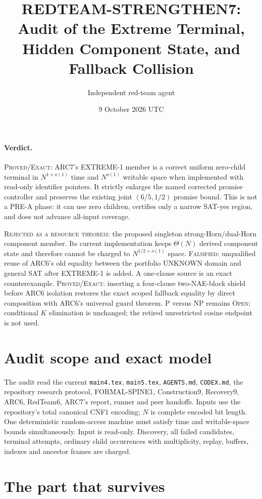 \documentclass[11pt]{article}
\title{REDTEAM-STRENGTHEN7: Audit of the Extreme Terminal,\\Hidden Component State, and Fallback Collision}
\author{Independent red-team agent}
\date{9 October 2026 UTC}
\begin{document}
\sloppy\maketitle

\paragraph{Verdict.}
\textsc{Proved/Exact}: ARC7's \textsc{EXTREME-1} member is a correct uniform
zero-child terminal in $N^{1+o(1)}$ time and $N^{o(1)}$ writable space when
implemented with read-only identifier pointers.  It strictly enlarges the
named corrected promise controller and preserves the existing joint
$(6/5,1/2)$ promise bound.  This is not a PRE-A phase: it can use zero
children, certifies only a narrow SAT-yes region, and does not advance
all-input coverage.

\textsc{Rejected as a resource theorem}: the proposed singleton
strong-Horn/dual-Horn component member.  Its current implementation keeps
$\Theta(N)$ derived component state and therefore cannot be charged to
$N^{1/2+o(1)}$ space.  \textsc{Falsified}: unqualified reuse of ARC6's old
equality between the portfolio UNKNOWN domain and general SAT after
\textsc{EXTREME-1} is added.  A one-clause source is an exact counterexample.
\textsc{Proved/Exact}: inserting a four-clause two-NAE-block shield before
ARC6 isolation restores the exact scoped fallback equality by direct
composition with ARC6's universal guard theorem.  P versus NP remains
\textsc{Open}; conditional
$K$ elimination is unchanged; the retired unrestricted cosine endpoint is
not used.

\section{Audit scope and exact model}

The audit read the current \texttt{main4.tex}, \texttt{main5.tex},
\texttt{AGENTS.md}, \texttt{CODEX.md}, the repository research protocol,
FORMAL-SPINE1, Construction9, Recovery9, ARC6, RedTeam6, ARC7's report,
runner and peer handoffs.  Inputs use the repository's total canonical CNF1
encoding; $N$ is complete encoded bit length.  One deterministic
random-access machine must satisfy time and writable-space bounds
simultaneously.  Input is read-only.  Discovery, all failed candidates,
terminal attempts, ordinary child occurrences with multiplicity, replay,
buffers, indexes and ancestor frames are charged.

\section{The part that survives}
\end{document}
